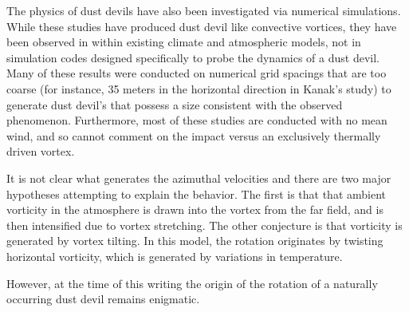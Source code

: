 
The physics of dust devils have also been investigated via numerical
simulations. While these studies have produced dust
devil like convective vortices, they have been observed in within
existing climate and atmospheric
models\cite{QJ:QJ200513160722,doi:10.3137/ao.420105}, not 
in simulation codes designed specifically to probe the dynamics of a
dust devil. Many of these results were conducted on numerical grid
spacings that are too coarse (for instance, 35 meters in the horizontal
direction in Kanak's study\cite{kanak2000formation}) to generate dust
devil's that possess a size consistent with the observed phenomenon.  
Furthermore, most of these studies are conducted with no mean wind, and
so cannot comment on the impact versus an exclusively thermally driven
vortex\cite{ohno2010mechanisms}. 

It is not clear what generates the azimuthal velocities and there are 
two major hypotheses attempting to explain the behavior. The first is that
that ambient vorticity in the atmosphere is drawn into the vortex from
the far field, and is then intensified due to vortex
stretching\cite{ROG:ROG1635}. The other conjecture is that vorticity is
generated by vortex tilting. In this model, the rotation originates by
twisting horizontal vorticity, which is generated by variations in 
temperature\cite{renno2004matador}. %



%
%

%
%
However, at the time of this writing the origin of
the rotation of a naturally occurring dust devil remains
enigmatic.  

%


%
%


